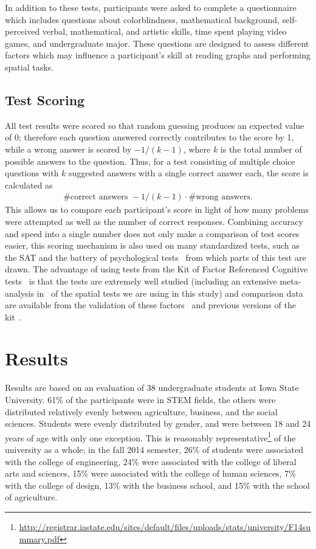 \documentclass[11pt]{isuthesis}\usepackage[]{graphicx}\usepackage[]{color}
\begin{document}
In addition to these tests, participants were asked to complete a questionnaire which includes questions about colorblindness, mathematical background, self-perceived verbal, mathematical, and artistic skills, time spent playing video games, and undergraduate major. 
These questions are designed to assess different factors which may influence a participant's skill at reading graphs and performing spatial tasks. 

\subsection{Test Scoring}\label{sec:scaling}

All test results were scored so that random guessing produces an expected value of 0; therefore each question answered correctly contributes to the score by 1, while a wrong answer is scored by $-1/(k-1)$, where $k$ is the total number of possible answers to the question. Thus, for a test consisting of multiple choice questions with $k$ suggested answers with a single correct answer each, the score is calculated as
\begin{eqnarray}\label{eq.scoring}
\# \text{correct answers } - 1/(k-1) \cdot \# \text{wrong answers}.
\end{eqnarray}
This allows us to compare each participant's score in light of how many problems were attempted as well as the number of correct responses. Combining accuracy and speed into a single number does not only make a comparison of test scores easier,  this scoring mechanism is also used on many standardized tests, such as the SAT and the battery of psychological tests~\citep{diamond1973correction, ekstrom1976manual} from which parts of this test are drawn. The advantage of using tests from the Kit of Factor Referenced Cognitive tests~\citep{ekstrom1976manual} is that the tests are extremely well studied (including an extensive meta-analysis in~\citep{voyer1995magnitude} of the spatial tests we are using in this study) and comparison data are available from the validation of these factors~\citep{schaie1998longitudinal,hampson1990variations,mayer1994whom} and previous versions of the kit~\citep{educational1963kit}.

\section{Results}\label{sec:results}
Results are based on an evaluation of 38 undergraduate students at Iowa State University. 61\% of the participants were in STEM fields, the others were distributed relatively evenly between agriculture, business, and the social sciences. Students were evenly distributed by gender, and were between 18 and 24 years of age with only one exception. This is reasonably representative\footnote{\url{http://registrar.iastate.edu/sites/default/files/uploads/stats/university/F14summary.pdf}} of the university as a whole; in the fall 2014 semester, 26\% of students were associated with the college of engineering, 24\% were associated with the college of liberal arts and sciences, 15\% were associated with the college of human sciences, 7\% with the college of design, 13\% with the business school, and 15\% with the school of agriculture.  
\end{document}
